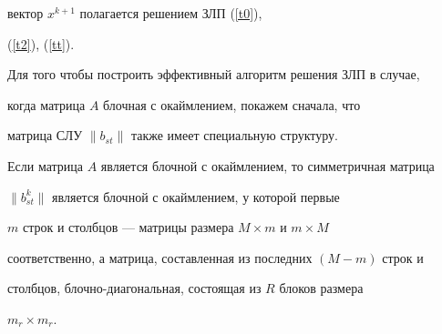 вектор $x^{k+1}$ полагается решением ЗЛП (\ref{t0}),


(\ref{t2}), (\ref{tt}).





Для того чтобы построить эффективный алгоритм решения ЗЛП в случае,


когда матрица $A$ блочная с окаймлением, покажем сначала, что


матрица СЛУ $\|b_{st}\|$ также имеет специальную структуру.





\begin{lem}\label{lem32}


Если матрица $A$ является блочной с окаймлением, то симметричная матрица


$\|b_{st}^k\|$ является блочной с окаймлением, у которой первые


$m$ строк и столбцов --- матрицы размера $M\times m$ и $m\times M$


соответственно, а матрица, составленная из последних $(M-m)$ строк и


столбцов, блочно-диагональная, состоящая из $R$ блоков размера


$m_{r}\times m_{r}$.


\end{lem}





